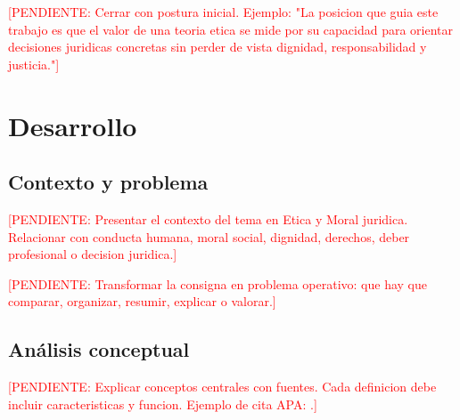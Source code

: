 \documentclass[
	spanish,
	letterpaper, oneside
]{article}
\newcommand{\pendiente}[1]{\textcolor{red}{[PENDIENTE: #1]}}
\begin{document}
\pendiente{Cerrar con postura inicial. Ejemplo: "La posicion que guia este trabajo es que el valor de una teoria etica se mide por su capacidad para orientar decisiones juridicas concretas sin perder de vista dignidad, responsabilidad y justicia."}

%
\section{Desarrollo}

\subsection{Contexto y problema}

\pendiente{Presentar el contexto del tema en Etica y Moral juridica. Relacionar con conducta humana, moral social, dignidad, derechos, deber profesional o decision juridica.}

\pendiente{Transformar la consigna en problema operativo: que hay que comparar, organizar, resumir, explicar o valorar.}

\subsection{Análisis conceptual}

\pendiente{Explicar conceptos centrales con fuentes. Cada definicion debe incluir caracteristicas y funcion. Ejemplo de cita APA: \citep{ronquilloarmasEticaGeneralProfesional2018}.}
\end{document}

